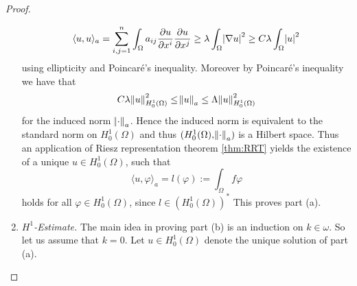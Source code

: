 \begin{proof}
\begin{enumerate}[label = \textit{Step \arabic*:},wide=0pt]
			\begin{equation*}
				\langle u,u\rangle_a = \sum_{i,j = 1}^n \int_\Omega a_{ij} \frac{\partial u}{\partial x^i}\frac{\partial u}{\partial x^j} \geq \lambda \int_\Omega\abs{\nabla u}^2 \geq C \lambda \int_\Omega \abs{u}^2
			\end{equation*}
			\noindent using ellipticity and Poincar\'e's inequality. Moreover by Poincar\'e's inequality we have that
			\begin{equation*}
				C \lambda \norm{u}^2_{H^1_0(\Omega)} \leq \norm{u}_a \leq \Lambda \norm{u}_{H^1_0(\Omega)}^2
			\end{equation*}
			\noindent for the induced norm $\norm{\cdot}_a$. Hence the induced norm is equivalent to the standard norm on $H^1_0(\Omega)$ and thus $(H^1_0(\Omega),\norm{\cdot}_a)$ is a Hilbert space. Thus an application of Riesz representation theorem \ref{thm:RRT} yields the existence of a unique $u \in H^1_0(\Omega)$, such that
			\begin{equation*}
				\langle u,\varphi \rangle_a = l(\varphi) := \int_\Omega f \varphi
			\end{equation*}
			\noindent holds for all $\varphi \in H^1_0(\Omega)$, since $l \in (H^1_0(\Omega))^*$ This proves part (a).
		\item \textit{$H^1$-Estimate.} The main idea in proving part (b) is an induction on $k \in \omega$. So let us assume that $k = 0$. Let $u \in H^1_0(\Omega)$ denote the unique solution of part (a).
			\begin{lemma}
				\label{lem:H^1_estimate}

			\end{lemma}
	\end{enumerate}
\end{proof}

\printbibliography

